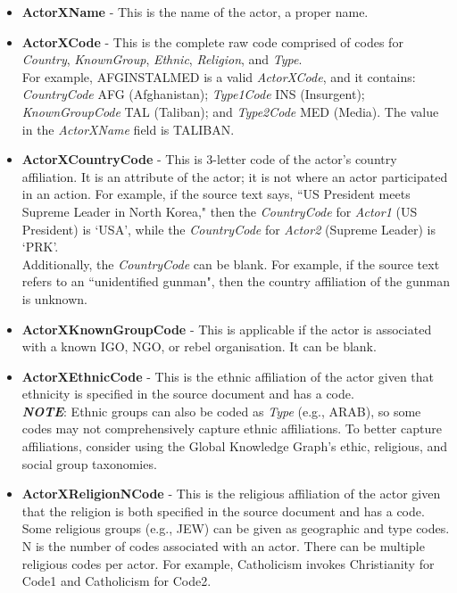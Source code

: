 \begin{itemize} 
  \item \textbf{ActorXName} - This is the name of the actor, a proper name.
  \item  \textbf{ActorXCode} - This is the complete raw code comprised of codes for \textit{Country}, \textit{KnownGroup}, \textit{Ethnic}, \textit{Religion}, and \textit{Type}.  \\For example, AFGINSTALMED is a valid \textit{ActorXCode}, and it contains: \textit{CountryCode} AFG (Afghanistan); \textit{Type1Code} INS (Insurgent); \textit{KnownGroupCode} TAL (Taliban); and \textit{Type2Code} MED (Media). The value in the \textit{ActorXName} field is TALIBAN.
  \item \textbf{ActorXCountryCode} - This is 3-letter code of the actor's country affiliation. It is an attribute of the actor; it is not where an actor participated in an action. For example, if the source text says, ``US President meets Supreme Leader in North Korea," then the \textit{CountryCode} for \textit{Actor1} (US President) is `USA', while the \textit{CountryCode} for \textit{Actor2} (Supreme Leader) is `PRK'.
 \\Additionally, the \textit{CountryCode} can be blank. For example, if the source text refers to an ``unidentified gunman", then the country affiliation of the gunman is unknown.
  \item \textbf{ActorXKnownGroupCode} - This is applicable if the actor is associated with a known IGO, NGO, or rebel organisation. It can be blank.
  \item \textbf{ActorXEthnicCode} - This is the ethnic affiliation of the actor given that ethnicity is specified in the source document and has a code.
   \\ \textbf{\textit{NOTE}}: Ethnic groups can also be coded as \textit{Type} (e.g., ARAB), so some codes may not comprehensively capture ethnic affiliations. To better capture affiliations, consider using the Global Knowledge Graph's ethic, religious, and social group taxonomies. 
  \item \textbf{ActorXReligionNCode} - This is the religious affiliation of the actor given that the religion is both specified in the source document and has a code. Some religious groups (e.g., JEW) can be given as geographic and type codes. 
\\N is the number of codes associated with an actor. There can be multiple religious codes per actor. For example, Catholicism invokes Christianity for Code1 and Catholicism for Code2. 

\end{itemize}
